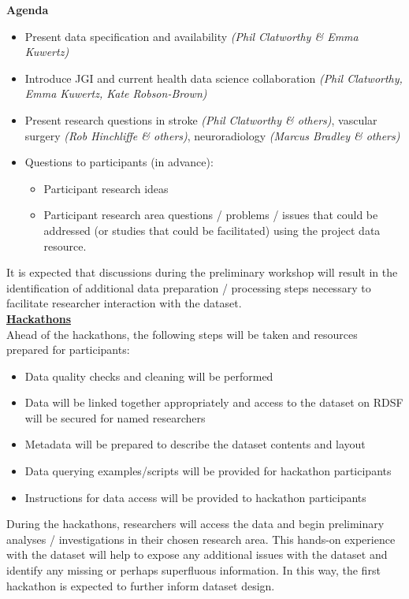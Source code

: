 \documentclass{article}
\begin{document}
\textbf{Agenda}
\begin{itemize}
\item    Present data specification and availability \textit{(Phil
    Clatworthy \& Emma Kuwertz)}
\item    Introduce JGI and current health data science collaboration \textit{(Phil
    Clatworthy, Emma Kuwertz, Kate Robson-Brown)}
\item    Present research questions in stroke \textit{(Phil
    Clatworthy \& others)}, vascular surgery \textit{(Rob Hinchliffe
    \& others)},
  neuroradiology \textit{(Marcus Bradley \& others)}
\item Questions to participants (in advance):
  \begin{itemize}
  \item Participant research ideas
  \item Participant research area questions / problems / issues that
    could be addressed (or studies that could be facilitated) using
    the project data resource.
  \end{itemize}
\end{itemize}

It is expected that discussions during the preliminary workshop will
result in the identification of additional data preparation /
processing steps necessary to facilitate researcher interaction with
the dataset.\\

\noindent\textbf{\underline{Hackathons}}\\

Ahead of the hackathons, the following steps will be
taken and resources
prepared for participants:

\begin{itemize}
\item Data quality checks and cleaning will be performed
\item Data will be linked together appropriately and access to the
  dataset on RDSF will be secured for named researchers
\item Metadata will be prepared to describe the dataset contents and layout
\item Data querying examples/scripts will be provided for hackathon participants
\item Instructions for data access will be provided to hackathon participants
\end{itemize}

During the hackathons, researchers will access the data and begin
preliminary analyses / investigations in their chosen research
area. This hands-on experience with the dataset will help to expose
any additional issues with the dataset and identify any missing or
perhaps superfluous information. In this way, the first hackathon is
expected to further inform dataset design. \\
\end{document}
